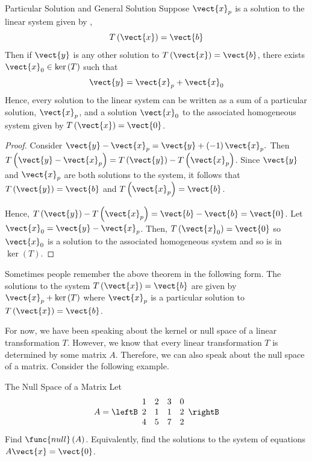 \begin{theorem}{Particular Solution and General Solution}\label{thm:particularandgeneralsolution}
Suppose $\vect{x}_{p}$ is a solution to the linear system given by ,
\begin{equation*}
T\left( \vect{x} \right) = \vect{b}
\end{equation*}
Then if $\vect{y}$ is any other solution to $T\left(\vect{x}\right)=\vect{b}$, 
 there exists $\vect{x}_0 \in \ker
\left( T\right) $ such that
\begin{equation*}
\vect{y} = \vect{x}_{p}+ \vect{x}_0
\end{equation*}
Hence, every solution to the linear system can be written as a sum of a particular solution, $\vect{x}_p$,
 and a solution $\vect{x}_0$ to the associated 
homogeneous system given by $T\left(\vect{x}\right)=\vect{0}$.
\end{theorem}

\begin{proof}
Consider $\vect{y} - \vect{x}_{p}= \vect{y} + \left(
-1\right) \vect{x}_{p}.$ Then $T\left( \vect{y} - \vect{x}_{p}\right) =T\left(\vect{y}\right)
-T\left( \vect{x}_{p} \right)$. Since $\vect{y}$ and $\vect{x}_{p}$ are both solutions to the system, it follows that $T\left(\vect{y}\right)= \vect{b} $
and $T\left(\vect{x}_p\right) = \vect{b}$. 

Hence, $T\left(\vect{y}\right)-T\left( \vect{x}_{p} \right)
=\vect{b} - \vect{b} = \vect{0}$.  Let $\vect{x}_0 = \vect{y} - \vect{x}_{p}$.
Then, $T\left(\vect{x}_0\right)= \vect{0} $ so $\vect{x}_0$ is a solution to the associated homogeneous system and so is in $\ker \left(T\right)$.
\end{proof}

Sometimes people remember the above theorem in the following form. The
solutions to the system $T\left(\vect{x}\right)=\vect{b}$ are given by 
$\vect{x}_{p}+\ker \left( T\right) $ where $\vect{x}_{p}$ is a particular
solution to $T\left(\vect{x}\right)=\vect{b}$.

For now, we have been speaking about the kernel or null space of a linear transformation $T$. However, 
we know that every linear transformation $T$ is determined by some matrix $A$. Therefore,
we can also speak about the null space of a matrix. Consider the following example.  

\begin{example}{The Null Space of a Matrix}\label{exa:matrixnullspace}
Let
\begin{equation*}
A=\leftB
\begin{array}{rrrr}
1 & 2 & 3 & 0 \\
2 & 1 & 1 & 2 \\
4 & 5 & 7 & 2
\end{array}
\rightB
\end{equation*}
Find $\func{null} \left( A\right) $. Equivalently, find the solutions to the
system of equations $A\vect{x}=\vect{0}$.
\end{example}

